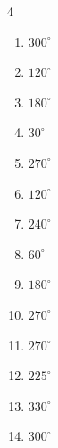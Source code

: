 


\setcounter{quesnum}{100}

\begin{multicols}{4}
\begin{enumerate}
  \itemsep=3pt
  \item $\displaystyle 300^{\circ}$

  \item $\displaystyle 120^{\circ}$

  \item $\displaystyle 180^{\circ}$
        \phantom{$\displaystyle =\pi$}

  \item $\displaystyle 30^{\circ}$

  \item $\displaystyle 270^{\circ}$

  \item $\displaystyle 120^{\circ}$

  \item $\displaystyle 240^{\circ}$

  \item $\displaystyle 60^{\circ}$

  \item $\displaystyle 180^{\circ}$
        \phantom{$\displaystyle =\pi$}

  \item $\displaystyle 270^{\circ}$

  \item $\displaystyle 270^{\circ}$

  \item $\displaystyle 225^{\circ}$

  \item $\displaystyle 330^{\circ}$

  \item $\displaystyle 300^{\circ}$


\end{enumerate}
\end{multicols}
